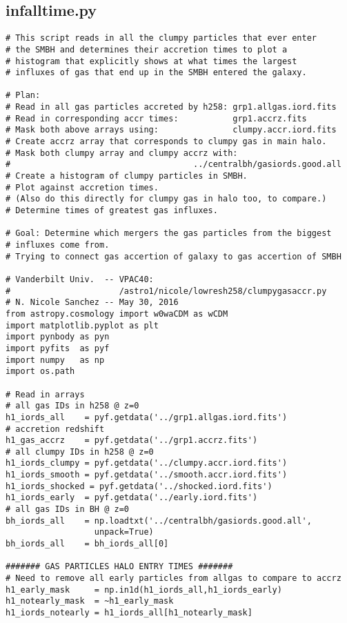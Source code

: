 \documentclass[12pt,headA,chapB]{fiskthesis}
\begin{document}
\subsection{infalltime.py}
\begin{verbatim}
# This script reads in all the clumpy particles that ever enter 
# the SMBH and determines their accretion times to plot a 
# histogram that explicitly shows at what times the largest 
# influxes of gas that end up in the SMBH entered the galaxy.

# Plan:
# Read in all gas particles accreted by h258: grp1.allgas.iord.fits
# Read in corresponding accr times:           grp1.accrz.fits
# Mask both above arrays using:               clumpy.accr.iord.fits
# Create accrz array that corresponds to clumpy gas in main halo.
# Mask both clumpy array and clumpy accrz with: 
#                                     ../centralbh/gasiords.good.all
# Create a histogram of clumpy particles in SMBH.
# Plot against accretion times.
# (Also do this directly for clumpy gas in halo too, to compare.)
# Determine times of greatest gas influxes.

# Goal: Determine which mergers the gas particles from the biggest 
# influxes come from.
# Trying to connect gas accertion of galaxy to gas accertion of SMBH

# Vanderbilt Univ.  -- VPAC40: 
#                      /astro1/nicole/lowresh258/clumpygasaccr.py 
# N. Nicole Sanchez -- May 30, 2016 
from astropy.cosmology import w0waCDM as wCDM
import matplotlib.pyplot as plt
import pynbody as pyn
import pyfits  as pyf
import numpy   as np
import os.path

# Read in arrays
# all gas IDs in h258 @ z=0
h1_iords_all    = pyf.getdata('../grp1.allgas.iord.fits')
# accretion redshift       
h1_gas_accrz    = pyf.getdata('../grp1.accrz.fits')             
# all clumpy IDs in h258 @ z=0
h1_iords_clumpy = pyf.getdata('../clumpy.accr.iord.fits')      
h1_iords_smooth = pyf.getdata('../smooth.accr.iord.fits')
h1_iords_shocked = pyf.getdata('../shocked.iord.fits')
h1_iords_early  = pyf.getdata('../early.iord.fits') 
# all gas IDs in BH @ z=0
bh_iords_all    = np.loadtxt('../centralbh/gasiords.good.all',
                  unpack=True) 
bh_iords_all    = bh_iords_all[0]

####### GAS PARTICLES HALO ENTRY TIMES #######
# Need to remove all early particles from allgas to compare to accrz
h1_early_mask     = np.in1d(h1_iords_all,h1_iords_early)
h1_notearly_mask  = ~h1_early_mask
h1_iords_notearly = h1_iords_all[h1_notearly_mask]


\end{verbatim}
\end{document}
